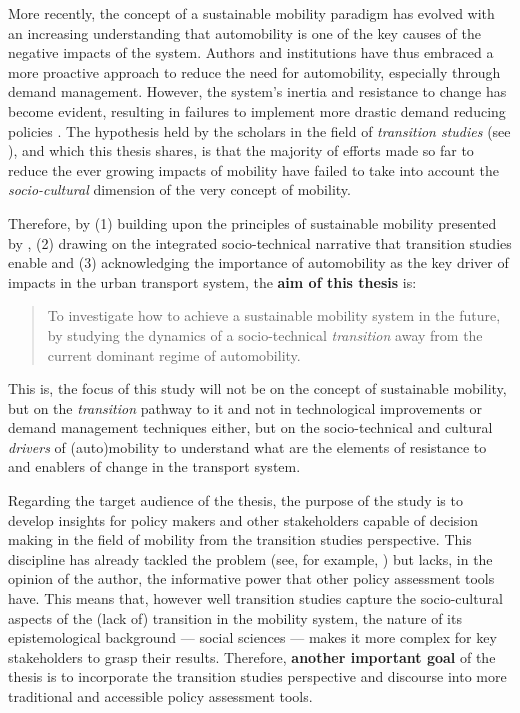 More recently, the concept of a sustainable mobility paradigm has evolved with an increasing understanding that automobility is one of the key causes of the negative impacts of the system. Authors and institutions have thus embraced a more proactive approach to reduce the need for automobility, especially through demand management. However, the system's inertia and resistance to change has become evident, resulting in failures to implement more drastic demand reducing policies \parencite{geels2012_AutomobilityTransitionSocio}. The hypothesis held by the scholars in the field of \textit{transition studies} (see ), and which this thesis shares, is that the majority of efforts made so far to reduce the ever growing impacts of mobility have failed to take into account the \textit{socio-cultural} dimension of the very concept of mobility.

Therefore, by (1) building upon the principles of sustainable mobility presented by \textcite{banister2008_sustainablemobilityparadigm}, (2) drawing on the integrated socio-technical narrative that transition studies enable and (3) acknowledging the importance of automobility as the key driver of impacts in the urban transport system, the \textbf{aim of this thesis} is:
\blockquote{To investigate how to achieve a sustainable mobility system in the future, by studying the dynamics of a socio-technical \textit{transition} away from the current dominant regime of automobility.}
This is, the focus of this study will not be on the concept of sustainable mobility, but on the \textit{transition} pathway to it and not in technological improvements or demand management techniques either, but on the socio-technical and cultural \textit{drivers} of (auto)mobility to understand what are the elements of resistance to and enablers of change in the transport system.

Regarding the target audience of the thesis, the purpose of the study is to develop insights for policy makers and other stakeholders capable of decision making in the field of mobility from the transition studies perspective. This discipline has already tackled the problem (see, for example, \textcite{geels2012_AutomobilityTransitionSocio}) but lacks, in the opinion of the author, the informative power that other policy assessment tools have. This means that, however well transition studies capture the socio-cultural aspects of the (lack of) transition in the mobility system, the nature of its epistemological background --- social sciences --- makes it more complex for key stakeholders to grasp their results. Therefore, \textbf{another important goal} of the thesis is to incorporate the transition studies perspective and discourse into more traditional and accessible policy assessment tools.

